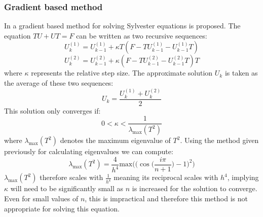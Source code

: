 \documentclass{article}
\numberwithin{equation}{section}
\begin{document}
\subsubsection{Gradient based method}
In \cite{Zhou} a gradient based method for solving Sylvester equations is proposed. The equation $TU + UT = F$ can be written as two recursive sequences:
	\begin{equation}
	U_k^{(1)} = U_{k-1}^{(1)} + \kappa T(F-TU_{k-1}^{(1)} - U_{k-1}^{(1)}T)
	\end{equation}
	\begin{equation}
	U_k^{(2)} = U_{k-1}^{(2)} + \kappa (F-TU_{k-1}^{(2)} - U_{k-1}^{(2)}T)T
	\end{equation}
where $\kappa$ represents the relative step size. The approximate solution $U_k$ is taken as the average of these two sequences:
	\begin{equation}
	U_k = \frac{U_k^{(1)} + U_k^{(2)}}{2}
	\end{equation}
This solution only converges if:
	\begin{equation}
	0 < \kappa < \frac{1}{\lambda_{\text{max}}(T^2)} 
	\end{equation}
where $\lambda_{\text{max}}(T^2)$ denotes the maximum eigenvalue of $T^2$. Using the method given previously for calculating eigenvalues we can compute:
\begin{equation}
\lambda_{\text{max}}(T^2) = \frac{4}{h^4} \text{max} \Big( \big( \cos{\Big(\frac{i \pi}{n+1} \Big) } -1 \big)^2 \Big)
\end{equation}
$\lambda_{\text{max}}(T^2)$ therefore scales with $\frac{1}{h^4}$ meaning its reciprocal scales with $h^4$, implying $\kappa$ will need to be significantly small as $n$ is increased for the solution to converge. Even for small values of $n$, this is impractical and therefore this method is not appropriate for solving this equation.
\end{document}
